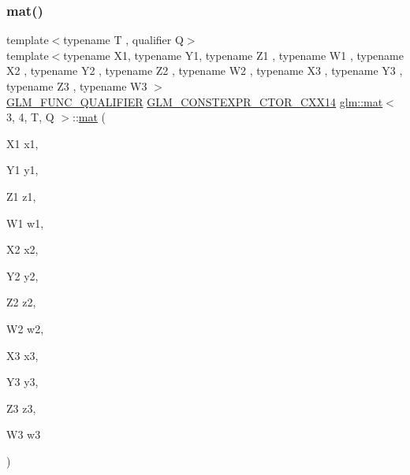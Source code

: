 \subsubsection{\texorpdfstring{mat()}{mat()}\hspace{0.1cm}{\footnotesize\ttfamily [19/21]}}
{\footnotesize\ttfamily template$<$typename T , qualifier Q$>$ \\
template$<$typename X1, typename Y1, typename Z1 , typename W1 , typename X2 , typename Y2 , typename Z2 , typename W2 , typename X3 , typename Y3 , typename Z3 , typename W3 $>$ \\
\mbox{\hyperlink{setup_8hpp_a33fdea6f91c5f834105f7415e2a64407}{G\+L\+M\+\_\+\+F\+U\+N\+C\+\_\+\+Q\+U\+A\+L\+I\+F\+I\+ER}} \mbox{\hyperlink{setup_8hpp_a0900f9145e68bf6061b6f5e7be3fa751}{G\+L\+M\+\_\+\+C\+O\+N\+S\+T\+E\+X\+P\+R\+\_\+\+C\+T\+O\+R\+\_\+\+C\+X\+X14}} \mbox{\hyperlink{structglm_1_1mat}{glm\+::mat}}$<$ 3, 4, T, Q $>$\+::\mbox{\hyperlink{structglm_1_1mat}{mat}} (\begin{DoxyParamCaption}\item[{X1}]{x1,  }\item[{Y1}]{y1,  }\item[{Z1}]{z1,  }\item[{W1}]{w1,  }\item[{X2}]{x2,  }\item[{Y2}]{y2,  }\item[{Z2}]{z2,  }\item[{W2}]{w2,  }\item[{X3}]{x3,  }\item[{Y3}]{y3,  }\item[{Z3}]{z3,  }\item[{W3}]{w3 }\end{DoxyParamCaption})}

\mbox{\label{structglm_1_1mat_3_013_00_014_00_01_t_00_01_q_01_4_ac2826bfed2065c9ecd22ac59bd41488b}} 
